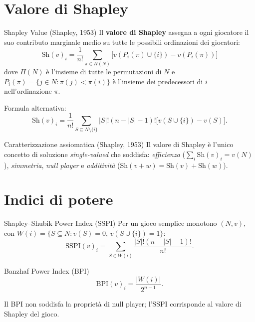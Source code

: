 \documentclass[12pt,a4paper,twoside]{book}
\theoremstyle{plain}
\theoremstyle{definition}
\begin{document}
\section{Valore di Shapley}

\begin{defbox}{Shapley Value (Shapley, 1953)}
Il \textbf{valore di Shapley} assegna a ogni giocatore il suo contributo marginale medio su tutte le possibili ordinazioni dei giocatori:
\[
  \mathrm{Sh}(v)_i = \frac{1}{n!}\sum_{\pi\in\Pi(N)} \bigl[v(P_i(\pi)\cup\{i\}) - v(P_i(\pi))\bigr]
\]
dove $\Pi(N)$ è l'insieme di tutte le permutazioni di $N$ e $P_i(\pi)=\{j\in N:\pi(j)<\pi(i)\}$ è l'insieme dei predecessori di $i$ nell'ordinazione $\pi$.

Formula alternativa:
\[
  \mathrm{Sh}(v)_i = \frac{1}{n!}\sum_{S\subseteq N\setminus\{i\}} |S|!(n-|S|-1)!\bigl[v(S\cup\{i\})-v(S)\bigr].
\]
\end{defbox}

\begin{thmbox}{Caratterizzazione assiomatica (Shapley, 1953)}
Il valore di Shapley è l'unico concetto di soluzione \emph{single-valued} che soddisfa: \emph{efficienza} ($\sum_i\mathrm{Sh}(v)_i=v(N)$), \emph{simmetria}, \emph{null player} e \emph{additività} ($\mathrm{Sh}(v+w)=\mathrm{Sh}(v)+\mathrm{Sh}(w)$).
\end{thmbox}

\section{Indici di potere}

\begin{defbox}{Shapley--Shubik Power Index (SSPI)}
Per un gioco semplice monotono $(N,v)$, con $W(i)=\{S\subseteq N : v(S)=0,\,v(S\cup\{i\})=1\}$:
\[
  \mathrm{SSPI}(v)_i = \sum_{S\in W(i)}\frac{|S|!(n-|S|-1)!}{n!}.
\]
\end{defbox}

\begin{defbox}{Banzhaf Power Index (BPI)}
\[
  \mathrm{BPI}(v)_i = \frac{|W(i)|}{2^{n-1}}.
\]
\end{defbox}
Il BPI non soddisfa la proprietà di null player; l'SSPI corrisponde al valore di Shapley del gioco.

\backmatter
\end{document}
